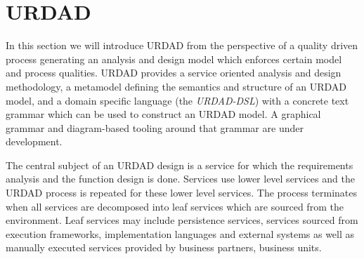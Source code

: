 \section{URDAD}
\label{sec:urdad}

In this section we will introduce URDAD from the perspective of a quality driven process generating an analysis and design model which enforces certain model and process qualities.  URDAD\cite{solms_generating_2009} provides a service oriented analysis and design methodology, a metamodel defining the semantics and structure of an URDAD model, and a domain specific language (the \emph{URDAD-DSL}) with a concrete text grammar which can be used to construct an URDAD model. A graphical grammar and diagram-based tooling around that grammar are under development. 

The central subject of an URDAD design is a service for which the requirements analysis and the function design is done. Services use lower level services and the URDAD process is repeated for these lower level services. The process terminates when all services are decomposed into leaf services which are sourced from the environment. Leaf services may include persistence services, services sourced from execution frameworks, implementation languages and external systems as well as manually executed services provided by business partners, business units.

